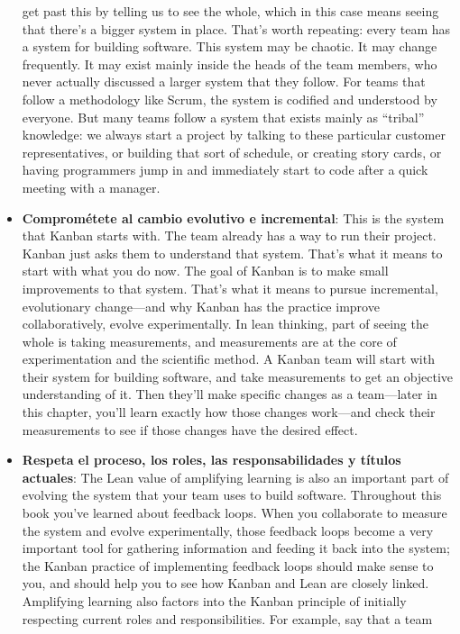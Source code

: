 \begin{itemize}
get past this by telling us to see the whole, which in this case means seeing that there's
a bigger system in place.
That's worth repeating: every team has a system for building software. This system may
be chaotic. It may change frequently. It may exist mainly inside the heads of the team
members, who never actually discussed a larger system that they follow. For teams
that follow a methodology like Scrum, the system is codified and understood by
everyone. But many teams follow a system that exists mainly as “tribal” knowledge:
we always start a project by talking to these particular customer representatives, or
building that sort of schedule, or creating story cards, or having programmers jump
in and immediately start to code after a quick meeting with a manager.
    \item \textbf{Comprométete al cambio evolutivo e incremental}: %
    This is the system that Kanban starts with. The team already has a way to run their
project. Kanban just asks them to understand that system. That's what it means to
start with what you do now. The goal of Kanban is to make small improvements to
that system. That's what it means to pursue incremental, evolutionary change—and
why Kanban has the practice improve collaboratively, evolve experimentally. In
lean thinking, part of seeing the whole is taking measurements, and measurements
are at the core of experimentation and the scientific method. A Kanban team will
start with their system for building software, and take measurements to get an
objective understanding of it. Then they'll make specific changes as a
team—later in this
chapter, you'll learn exactly how those changes work—and check their measurements
to see if those changes have the desired effect.
    \item \textbf{Respeta el proceso, los roles, las responsabilidades y títulos actuales}: %
    The Lean value of amplifying learning is also an important part of evolving the system that your team uses to build software. Throughout this book you've learned
about feedback loops. When you collaborate to measure the system and evolve
experimentally, those feedback loops become a very important tool for gathering
information and feeding it back into the system; the Kanban practice of
implementing feedback loops should make sense to you, and should help you to see
how Kanban and Lean are closely linked.
Amplifying learning also factors into the Kanban principle of initially
respecting current roles and responsibilities. For example, say that a team

\end{itemize}
